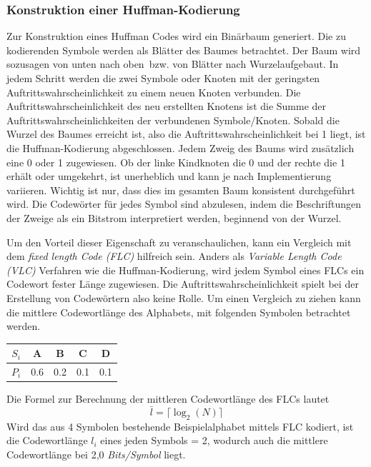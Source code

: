 \subsubsection{Konstruktion einer Huffman-Kodierung}
\label{subsubsec:konstruktion_huffman}
Zur Konstruktion eines Huffman Codes wird ein Binärbaum generiert.
Die zu kodierenden Symbole werden als Blätter des Baumes betrachtet.
Der Baum wird sozusagen von \glqq unten nach oben\grqq\ bzw. von \glqq Blätter nach Wurzel\grqq aufgebaut. \newline
In jedem Schritt werden die zwei Symbole oder Knoten mit der geringsten Auftrittswahrscheinlichkeit zu einem neuen Knoten verbunden.
Die Auftrittswahrscheinlichkeit des neu erstellten Knotens ist die Summe der Auftrittswahrscheinlichkeiten der verbundenen Symbole/Knoten.
Sobald die Wurzel des Baumes erreicht ist, also die Auftrittswahrscheinlichkeit bei 1 liegt, ist die Huffman-Kodierung abgeschlossen.
Jedem Zweig des Baums wird zusätzlich eine 0 oder 1 zugewiesen.
Ob der linke Kindknoten die 0 und der rechte die 1 erhält oder umgekehrt, ist unerheblich und kann je nach Implementierung variieren.
Wichtig ist nur, dass dies im gesamten Baum konsistent durchgeführt wird.
Die Codewörter für jedes Symbol sind abzulesen, indem die Beschriftungen der Zweige als ein Bitstrom interpretiert werden, beginnend von der Wurzel.

Um den Vorteil dieser Eigenschaft zu veranschaulichen, kann ein Vergleich mit dem \textit{fixed length Code (FLC)} hilfreich sein.
Anders als \textit{Variable Length Code (VLC)} Verfahren wie die Huffman-Kodierung, wird jedem Symbol eines FLCs ein Codewort fester Länge zugewiesen.
Die Auftrittswahrscheinlichkeit spielt bei der Erstellung von Codewörtern also keine Rolle.
Um einen Vergleich zu ziehen kann die mittlere Codewortlänge des Alphabets, mit folgenden Symbolen betrachtet werden.

\begin{table}[h]
\centering
\begin{tabular}{ccccc}
\toprule
\textbf{\textit{\(S_i\)}} & {A} & {B} & {C} & {D} \\
\midrule
\textbf{\textit{\(P_i\)}} & 0.6 & 0.2 & 0.1 & 0.1\\
\bottomrule
\end{tabular}
\end{table}

Die Formel zur Berechnung der mittleren Codewortlänge des FLCs lautet
\begin{equation*}
\bar{l} = \lceil \log_2(N) \rceil
\end{equation*}
Wird das aus 4 Symbolen bestehende Beispielalphabet mittels FLC kodiert, ist die Codewortlänge \(l_i\) eines jeden Symbols = 2, wodurch auch die mittlere Codewortlänge bei 2,0 \textit{Bits/Symbol} liegt.

